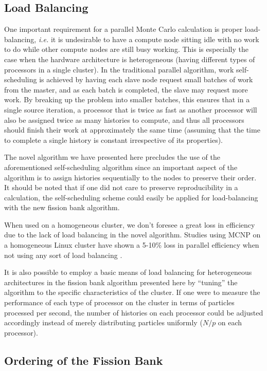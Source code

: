 \subsection{Load Balancing}
\label{load-balancing}

One important requirement for a parallel Monte Carlo calculation is
proper load-balancing, {\em i.e.} it is undesirable to have a compute
node sitting idle with no work to do while other compute nodes are
still busy working. This is especially the case when the hardware
architecture is heterogeneous (having different types of processors in
a single cluster). In the traditional parallel algorithm, work
self-scheduling is achieved by having each slave node request small
batches of work from the master, and as each batch is completed, the
slave may request more work. By breaking up the problem into smaller
batches, this ensures that in a single source iteration, a processor
that is twice as fast as another processor will also be assigned twice
as many histories to compute, and thus all processors should finish
their work at approximately the same time (assuming that the time to
complete a single history is constant irrespective of its properties).

The novel algorithm we have presented here precludes the use of the
aforementioned self-scheduling algorithm since an important aspect of
the algorithm is to assign histories sequentially to the nodes to
preserve their order. It should be noted that if one did not care to
preserve reproducibility in a calculation, the self-scheduling scheme
could easily be applied for load-balancing with the new fission bank
algorithm.

When used on a homogeneous cluster, we don't foresee a great loss in
efficiency due to the lack of load balancing in the novel
algorithm. Studies using MCNP on a homogeneous Linux cluster have
shown a 5-10\% loss in parallel efficiency when not using any sort of
load balancing \cite{brown-lectures}.

It is also possible to employ a basic means of load balancing for
heterogeneous architectures in the fission bank algorithm presented
here by ``tuning'' the algorithm to the specific characteristics of
the cluster. If one were to measure the performance of each type of
processor on the cluster in terms of particles processed per second,
the number of histories on each processor could be adjusted
accordingly instead of merely distributing particles uniformly ($N/p$
on each processor).

\subsection{Ordering of the Fission Bank}

